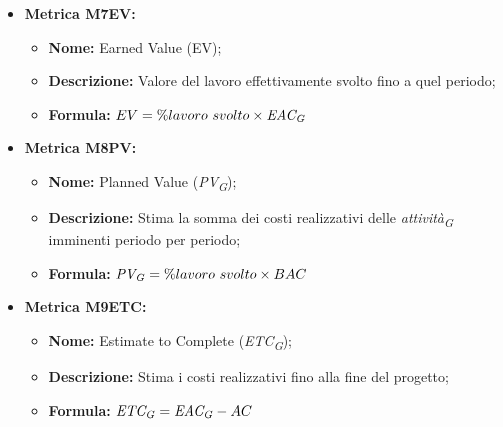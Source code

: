 \begin{itemize}
    \vspace{0.4cm}
    \item \hypertarget{item:M7EV}{\textbf{Metrica M7EV:}}
    \vspace{0.2cm}

    \begin{minipage}[H]{0.9\textwidth}
        \begin{itemize}
            \item \textbf{Nome:} Earned Value (EV);
            \item \textbf{Descrizione:} Valore del lavoro effettivamente svolto fino a quel periodo;
            \item \textbf{Formula:} $EV = \% lavoro \ svolto \times \textit{EAC}\textsubscript{\textit{G}}$
        \end{itemize}
    \end{minipage}

    \vspace{0.4cm}
    \item \hypertarget{item:M8PV}{\textbf{Metrica M8PV:}}
    \vspace{0.2cm}

    \begin{minipage}[H]{0.9\textwidth}
        \begin{itemize}
            \item \textbf{Nome:} Planned Value (\textit{PV}\textsubscript{\textit{G}});
            \item \textbf{Descrizione:} Stima la somma dei costi realizzativi delle \textit{attività}\textsubscript{\textit{G}} imminenti periodo per periodo;
            \item \textbf{Formula:} $\textit{PV}\textsubscript{\textit{G}} = \% lavoro \ svolto \times BAC$
        \end{itemize}
    \end{minipage}

    \vspace{0.4cm}
    \item \hypertarget{item:M9ETC}{\textbf{Metrica M9ETC:}}
    \vspace{0.2cm}

    \begin{minipage}[H]{0.9\textwidth}
        \begin{itemize}
            \item \textbf{Nome:} Estimate to Complete (\textit{ETC}\textsubscript{\textit{G}});
            \item \textbf{Descrizione:} Stima i costi realizzativi fino alla fine del progetto;
            \item \textbf{Formula:} $\textit{ETC}\textsubscript{\textit{G}} =\textit{EAC}\textsubscript{\textit{G}} - AC$
        \end{itemize}
    \end{minipage}


\end{itemize}
